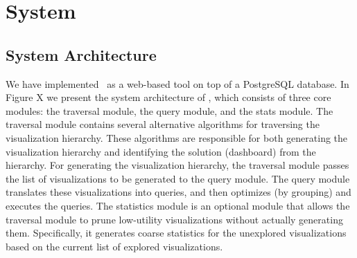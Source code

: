 \newpage
\section{System}
\subsection{System Architecture}

We have implemented \system\ as a web-based tool on top of a PostgreSQL database. In Figure X we present the system architecture of \system, which consists of three core modules: the traversal module, the query module, and the stats module. The traversal module contains several alternative algorithms for traversing the visualization hierarchy. These algorithms are responsible for both generating the visualization hierarchy and identifying the solution (dashboard) from the hierarchy. For generating the visualization hierarchy, the traversal module passes the list of visualizations to be generated to the query module. The query module translates these visualizations into queries, and then optimizes (by grouping) and executes the queries. The statistics module is an optional module that allows the traversal module to prune low-utility visualizations without actually generating them. Specifically, it generates coarse statistics for the unexplored visualizations based on the current list of explored visualizations. 

\begin{center}
\end{center}


